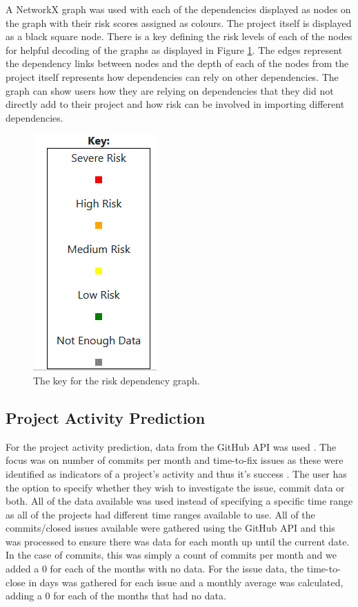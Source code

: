 \documentclass[conference]{IEEEtran}
\begin{document}
A NetworkX graph was used with each of the dependencies displayed as nodes on the graph with their risk scores assigned as colours. The project itself is displayed as a black square node. There is a key defining the risk levels of each of the nodes for helpful decoding of the graphs as displayed in Figure \ref{fig:key}. The edges represent the dependency links between nodes and the depth of each of the nodes from the project itself represents how dependencies can rely on other dependencies. The graph can show users how they are relying on dependencies that they did not directly add to their project and how risk can be involved in importing different dependencies. 

\begin{figure}
\begin{center}
    \includegraphics[scale=0.5]{Key.png}
    \caption{The key for the risk dependency graph.}
    \label{fig:key}
\end{center}
\end{figure}

\subsection{Project Activity Prediction}
For the project activity prediction, data from the GitHub API was used \cite{noauthor_github_nodate}. The focus was on number of commits per month and time-to-fix issues as these were identified as indicators of a project's activity and thus it's success \cite{sen_open_2012, chahal_fuzzy_2016}. The user has the option to specify whether they wish to investigate the issue, commit data or both. All of the data available was used instead of specifying a specific time range as all of the projects had different time ranges available to use. All of the commits/closed issues available were gathered using the GitHub API and this was processed to ensure there was data for each month up until the current date. In the case of commits, this was simply a count of commits per month and we added a 0 for each of the months with no data. For the issue data, the time-to-close in days was gathered for each issue and a monthly average was calculated, adding a 0 for each of the months that had no data. 
\end{document}
